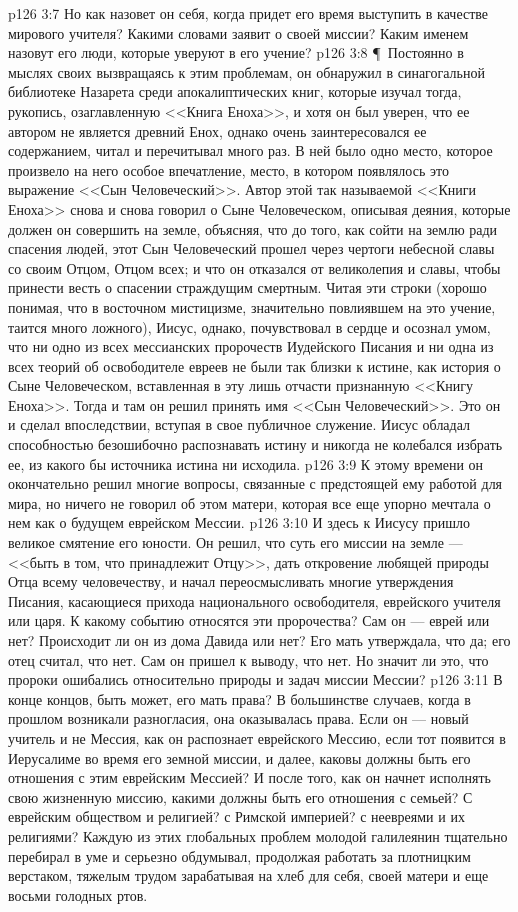 \vs p126 3:7 Но как назовет он себя, когда придет его время выступить в качестве мирового учителя? Какими словами заявит о своей миссии? Каким именем назовут его люди, которые уверуют в его учение?
\vs p126 3:8 \P\ Постоянно в мыслях своих вызвращаясь к этим проблемам, он обнаружил в синагогальной библиотеке Назарета среди апокалиптических книг, которые изучал тогда, рукопись, озаглавленную <<Книга Еноха>>, и хотя он был уверен, что ее автором не является древний Енох, однако очень заинтересовался ее содержанием, читал и перечитывал много раз. В ней было одно место, которое произвело на него особое впечатление, место, в котором появлялось это выражение <<Сын Человеческий>>. Автор этой так называемой <<Книги Еноха>> снова и снова говорил о Сыне Человеческом, описывая деяния, которые должен он совершить на земле, объясняя, что до того, как сойти на землю ради спасения людей, этот Сын Человеческий прошел через чертоги небесной славы со своим Отцом, Отцом всех; и что он отказался от великолепия и славы, чтобы принести весть о спасении страждущим смертным. Читая эти строки (хорошо понимая, что в восточном мистицизме, значительно повлиявшем на это учение, таится много ложного), Иисус, однако, почувствовал в сердце и осознал умом, что ни одно из всех мессианских пророчеств Иудейского Писания и ни одна из всех теорий об освободителе евреев не были так близки к истине, как история о Сыне Человеческом, вставленная в эту лишь отчасти признанную <<Книгу Еноха>>. Тогда и там он решил принять имя <<Сын Человеческий>>. Это он и сделал впоследствии, вступая в свое публичное служение. Иисус обладал способностью безошибочно распознавать истину и никогда не колебался избрать ее, из какого бы источника истина ни исходила.
\vs p126 3:9 К этому времени он окончательно решил многие вопросы, связанные с предстоящей ему работой для мира, но ничего не говорил об этом матери, которая все еще упорно мечтала о нем как о будущем еврейском Мессии.
\vs p126 3:10 И здесь к Иисусу пришло великое смятение его юности. Он решил, что суть его миссии на земле --- <<быть в том, что принадлежит Отцу>>, дать откровение любящей природы Отца всему человечеству, и начал переосмысливать многие утверждения Писания, касающиеся прихода национального освободителя, еврейского учителя или царя. К какому событию относятся эти пророчества? Сам он --- еврей или нет? Происходит ли он из дома Давида или нет? Его мать утверждала, что да; его отец считал, что нет. Сам он пришел к выводу, что нет. Но значит ли это, что пророки ошибались относительно природы и задач миссии Мессии?
\vs p126 3:11 В конце концов, быть может, его мать права? В большинстве случаев, когда в прошлом возникали разногласия, она оказывалась права. Если он --- новый учитель и не Мессия, как он распознает еврейского Мессию, если тот появится в Иерусалиме во время его земной миссии, и далее, каковы должны быть его отношения с этим еврейским Мессией? И после того, как он начнет исполнять свою жизненную миссию, какими должны быть его отношения с семьей? С еврейским обществом и религией? с Римской империей? с неевреями и их религиями? Каждую из этих глобальных проблем молодой галилеянин тщательно перебирал в уме и серьезно обдумывал, продолжая работать за плотницким верстаком, тяжелым трудом зарабатывая на хлеб для себя, своей матери и еще восьми голодных ртов.
